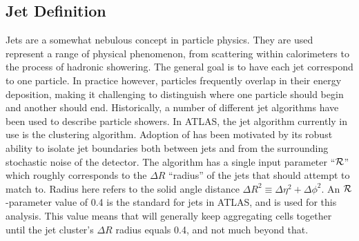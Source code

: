         \subsection{Jet Definition}
            
        Jets are a somewhat nebulous concept in particle physics.
        They are used represent a range of physical phenomenon,
            from scattering within calorimeters to the process of hadronic showering.
        The general goal is to have each jet correspond to one particle.
        In practice however, particles frequently overlap in their energy deposition,
            making it challenging to distinguish where one particle should begin and another should end.
        Historically, a number of different jet algorithms have been used to describe particle showers.
        In ATLAS, the jet algorithm currently in use is the \textit{\antikt} clustering algorithm\cite{anti_kt}.
        Adoption of \antikt has been motivated by its robust ability to isolate jet boundaries both between jets
            and from the surrounding stochastic noise of the detector.
        The \antikt algorithm has a single input parameter ``$\mathcal{R}$'' which roughly corresponds to the $\Delta R$ ``radius''
            of the jets that \antikt should attempt to match to.
        Radius here refers to the solid angle distance 
            $\Delta R^2 \equiv \Delta \eta^2 + \Delta \phi^2$.
        An $\mathcal{R}$-parameter value of 0.4 is the standard for jets in ATLAS, and is used for this analysis.
        This value means that \antikt will generally keep aggregating cells together until the jet cluster's
            $\Delta R$ radius equals 0.4, and not much beyond that.



